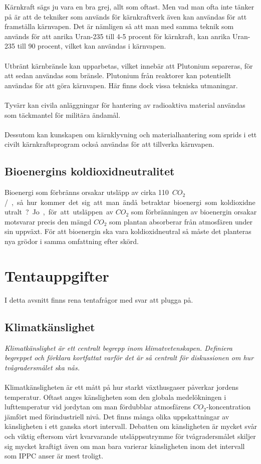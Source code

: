 \documentclass{article}
\begin{document}
Kärnkraft sägs ju vara en bra grej, allt som oftast. Men vad man ofta inte tänker på är att de tekniker som används för kärnkraftverk även kan användas för att framställa kärnvapen. Det är nämligen så att man med samma teknik som används för att anrika Uran-235 till 4-5 procent för  kärnkraft, kan anrika Uran-235 till 90 procent, vilket kan användas i kärnvapen.\\
\\
Utbränt kärnbränsle kan upparbetas, vilket innebär att Plutonium separeras, för att sedan användas som bränsle. Plutonium från reaktorer kan potentiellt användas för att göra kärnvapen. Här finns dock vissa tekniska utmaningar.\\
\\
Tyvärr kan civila anläggningar för hantering av radioaktiva material användas som täckmantel för militära ändamål.\\
\\
Dessutom kan kunskapen om kärnklyvning och materialhantering som sprids i ett civilt kärnkraftsprogram också användas för att tillverka kärnvapen.

\subsection{Bioenergins koldioxidneutralitet}

Bioenergi som förbränns orsakar utsläpp av cirka \SI{110}{\g $CO_2$/\mega\joule}, så hur kommer det sig att man ändå betraktar bioenergi som koldioxidneutralt? Jo, för att utsläppen av $CO_2$ som förbränningen av bioenergin orsakar motsvarar precis den mängd $CO_2$ som plantan absorberar från atmosfären under sin uppväxt. För att bioenergin ska vara koldioxidneutral så måste det planteras nya grödor i samma omfattning efter skörd.


\section{Tentauppgifter}

I detta avsnitt finns rena tentafrågor med svar att plugga på.

\subsection{Klimatkänslighet}
\textit{Klimatkänslighet är ett centralt begrepp inom klimatvetenskapen. Definiera begreppet och förklara kortfattat varför det är så centralt för diskussionen om hur tvågradersmålet ska nås.}\\
\\
Klimatkänsligheten är ett mått på hur starkt växthusgaser påverkar jordens temperatur. Oftast anges känsligheten som den globala medelökningen i lufttemperatur vid jordytan om man fördubblar atmosfärens $CO_2$-koncentration jämfört med förindustriell nivå. Det finns många olika uppskattningar av känsligheten i ett ganska stort intervall. Debatten om känsligheten är mycket svår och viktig eftersom vårt kvarvarande utsläppsutrymme för tvågradersmålet skiljer sig mycket kraftigt även om man bara varierar känsligheten inom det intervall som IPPC anser är mest troligt.
\end{document}
